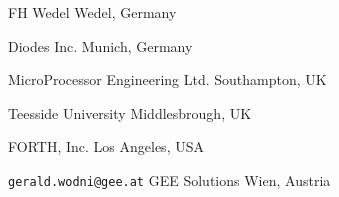 	{}
	{FH Wedel}
	{Wedel, Germany}

	{}
	{Diodes Inc.}
	{Munich, Germany}

	{}
	{MicroProcessor Engineering Ltd.}
	{Southampton, UK}

	{}
	{Teesside University}
	{Middlesbrough, UK}



	{}
	{FORTH, Inc.}
	{Los Angeles, USA}

	{\texttt{gerald.wodni@gee.at}}
	{GEE Solutions}
	{Wien, Austria}
